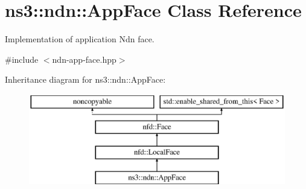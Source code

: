 \hypertarget{classns3_1_1ndn_1_1AppFace}{}\section{ns3\+:\+:ndn\+:\+:App\+Face Class Reference}
\label{classns3_1_1ndn_1_1AppFace}


Implementation of application Ndn face.  




{\ttfamily \#include $<$ndn-\/app-\/face.\+hpp$>$}

Inheritance diagram for ns3\+:\+:ndn\+:\+:App\+Face\+:\begin{figure}[H]
\begin{center}
\leavevmode
\includegraphics[height=4.000000cm]{classns3_1_1ndn_1_1AppFace}
\end{center}
\end{figure}
